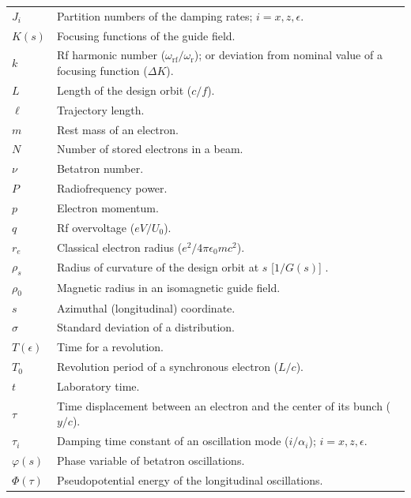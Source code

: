 \documentclass[sands-adaptation.tex]{subfiles}
\begin{document}
\begin{tabularx}{\linewidth}{@{}lX@{}}
	$J_i$		& Partition numbers of the damping rates; $i = x, z, \epsilon$.\\
    $K(s)$		& Focusing functions of the guide field.\\
	$k$			& Rf harmonic number ($\omega_\text{rf}/\omega_\text{r}$); or deviation from nominal value of a focusing function ($\Delta K$).\\
    $L$			& Length of the design orbit ($c/f$).\\
    $\ell$		& Trajectory length.\\
    $m$			& Rest mass of an electron.\\
    $N$			& Number of stored electrons in a beam.\\
	$\nu$		& Betatron number.\\
	$P$			& Radiofrequency power.\\
    $p$			& Electron momentum.\\
	$q$			& Rf overvoltage ($eV/U_0$).\\
	$r_e$		& Classical electron radius ($e^2/4\pi\epsilon_0 m c^2$).\\
    $\rho_s$	& Radius of curvature of the design orbit at $s$ [$1/G(s)$] .\\
    $\rho_0$	& Magnetic radius in an isomagnetic guide field.\\
	$s$			& Azimuthal (longitudinal) coordinate.\\
    $\sigma$	& Standard deviation of a distribution.\\
	$T(\epsilon)$ & Time for a revolution.\\
	$T_0$		& Revolution period of a synchronous electron ($L/c$).\\
	$t$			& Laboratory time.\\
	$\tau$		& Time displacement between an electron and the center of its bunch ($y/c$).\\
	$\tau_i$	& Damping time constant of an oscillation mode ($i/\alpha_i$); $i = x,z,\epsilon$.\\
	$\varphi(s)$ & Phase variable of betatron oscillations.\\
	$\Phi(\tau)$		&  Pseudopotential energy of the longitudinal oscillations.\\

\end{tabularx}
\end{document}
